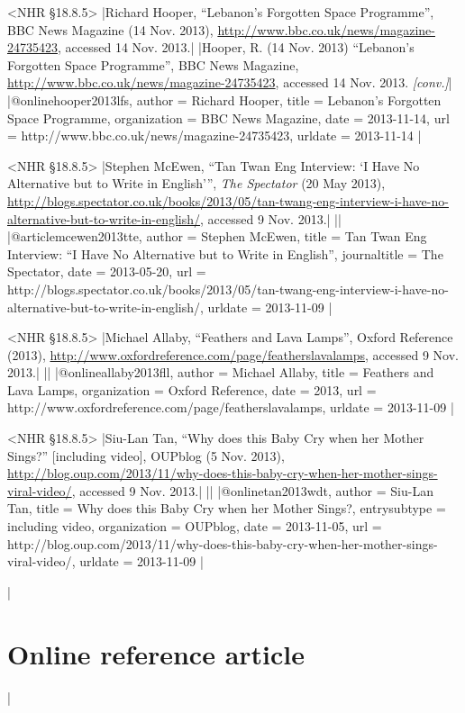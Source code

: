 \documentclass[extrafontsizes,11pt,a4paper,oneside]{memoir}
\begin{document}
\bibexample<NHR \S18.8.5>
|Richard Hooper, \enquote{Lebanon's Forgotten Space Programme}, BBC News Magazine (14 Nov. 2013), \url{http://www.bbc.co.uk/news/magazine-24735423}, accessed 14 Nov. 2013.|%
|Hooper, R. (14 Nov. 2013) \enquote{Lebanon's Forgotten Space Programme}, BBC News Magazine, \url{http://www.bbc.co.uk/news/magazine-24735423}, accessed 14 Nov. 2013. \emph{[conv.]}|%
|@online{hooper2013lfs,
  author = {Richard Hooper},
  title = {Lebanon's Forgotten Space Programme},
  organization = {BBC News Magazine},
  date = {2013-11-14},
  url = {http://www.bbc.co.uk/news/magazine-24735423},
  urldate = {2013-11-14}
}|

\bibexample<NHR \S18.8.5>
|Stephen McEwen, \enquote{Tan Twan Eng Interview: \enquote{I Have No Alternative but to Write in English}}, \emph{The Spectator} (20 May 2013), \url{http://blogs.spectator.co.uk/books/2013/05/tan-twang-eng-interview-i-have-no-alternative-but-to-write-in-english/}, accessed 9 Nov. 2013.|%
||%
|@article{mcewen2013tte,
  author = {Stephen McEwen},
  title = {Tan Twan Eng Interview: \enquote{I Have No Alternative but to Write in English}},
  journaltitle = {The Spectator},
  date = {2013-05-20},
  url = {http://blogs.spectator.co.uk/books/2013/05/tan-twang-eng-interview-i-have-no-alternative-but-to-write-in-english/},
  urldate = {2013-11-09}
}|

\bibexample<NHR \S18.8.5>
|Michael Allaby, \enquote{Feathers and Lava Lamps}, Oxford Reference (2013), \url{http://www.oxfordreference.com/page/featherslavalamps}, accessed 9 Nov. 2013.|%
||%
|@online{allaby2013fll,
  author = {Michael Allaby},
  title = {Feathers and Lava Lamps},
  organization = {Oxford Reference},
  date = {2013},
  url = {http://www.oxfordreference.com/page/featherslavalamps},
  urldate = {2013-11-09}
}|

\bibexample<NHR \S18.8.5>
|Siu-Lan Tan, \enquote{Why does this Baby Cry when her Mother Sings?} [including video], OUPblog (5 Nov. 2013), \url{http://blog.oup.com/2013/11/why-does-this-baby-cry-when-her-mother-sings-viral-video/}, accessed 9 Nov. 2013.|%
||%
|@online{tan2013wdt,
  author = {Siu-Lan Tan},
  title = {Why does this Baby Cry when her Mother Sings?},
  entrysubtype = {including video},
  organization = {OUPblog},
  date = {2013-11-05},
  url = {http://blog.oup.com/2013/11/why-does-this-baby-cry-when-her-mother-sings-viral-video/},
  urldate = {2013-11-09}
}|

\todoc|
\section{Online reference article}
|
\end{document}
